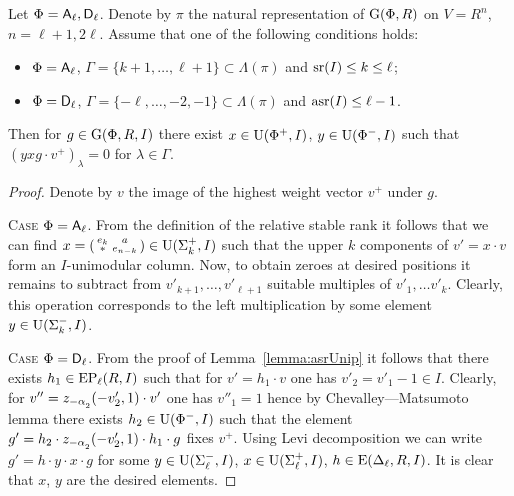 \begin{lemma} \label{lemma:uraction} 
Let $\Phi=\mathsf{A}_\ell, \mathsf{D}_\ell$. Denote by $\pi$ the natural representation of $\operatorname{G}(\Phi, R)$ on $V=R^n$, $n=\ell+1,2\ell$.
Assume that one of the following conditions holds:
\begin{itemize}
 \item $\Phi=\mathsf{A}_\ell$, $\Gamma=\{ k+1, \ldots, \ell+1\} \subset \Lambda(\pi)$ and $\operatorname{sr}(I)\leq k\leq \ell$;
 \item $\Phi=\mathsf{D}_\ell$, $\Gamma=\{-\ell,\ldots, -2, -1\} \subset \Lambda(\pi)$ and $\operatorname{asr}(I)\leq \ell-1$. 
\end{itemize}
Then for $g\in \operatorname{G}(\Phi, R, I)$ there exist $x\in \operatorname{U}(\Phi^+, I)$, $y\in \operatorname{U}(\Phi^-, I)$ such that $(yxg \cdot v^+)_\lambda = 0$ for $\lambda\in \Gamma$.
\end{lemma}
\begin{proof} Denote by $v$ the image of the highest weight vector $v^+$ under $g$.

\textsc{Case $\Phi=\mathsf{A}_\ell$.} From the definition of the relative stable rank it follows that we can find 
$x= \left(\begin{smallmatrix} e_k & a \\ * & e_{n-k} \end{smallmatrix}\right) \in \operatorname{U}(\Sigma_k^+, I)$ such that 
the upper $k$ components of $v'= x \cdot v$ form an $I$-unimodular column. 
Now, to obtain zeroes at desired positions it remains to subtract from $v'_{k+1},\ldots, v'_{\ell+1}$ suitable multiples of $v'_1,\ldots v'_k$.
Clearly, this operation corresponds to the left multiplication by some element $y\in\operatorname{U}(\Sigma_k^-, I)$.

\textsc{Case $\Phi=\mathsf{D}_\ell$.} From the proof of Lemma~\ref{lemma:asrUnip} it follows that there exists $h_1 \in \operatorname{EP}_\ell(R, I)$ such that for $v'=h_1\cdot v$ one has $v'_2=v'_1-1\in I$.
Clearly, for $v'' = z_{-\alpha\ssub{2}}(-v'_2, 1)\cdot v'$ one has $v''_1=1$ hence by Chevalley---Matsumoto lemma there exists $h_2 \in \operatorname{U}(\Phi^-, I)$ such that the element
$g'=h_2 \cdot z_{-\alpha\ssub{2}}(-v'_2, 1) \cdot h_1 \cdot g$ fixes $v^+$. 
Using Levi decomposition we can write $g'=h \cdot y \cdot x \cdot g$ for some $y\in\operatorname{U}(\Sigma^-_\ell, I)$, $x \in \operatorname{U}(\Sigma^+_\ell, I)$, $h\in\operatorname{E}(\Delta_\ell, R, I)$.
It is clear that $x$, $y$ are the desired elements.
\end{proof}